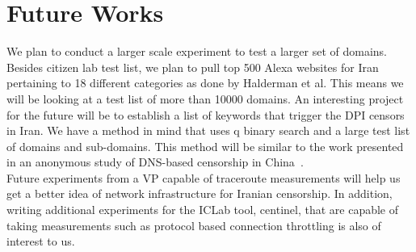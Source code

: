 \section{Future Works}\label{sec:futureworks}
We plan to conduct a larger scale experiment to test a larger set of domains. Besides citizen lab test list, we plan to pull top 500 Alexa websites for Iran pertaining to 18 different categories as done by Halderman et al. This means we will be looking at a test list of more than 10000 domains. An interesting project for the future will be to establish a list of keywords that trigger the DPI censors in Iran. We have a method in mind that uses q binary search and a large test list of domains and sub-domains. This method will be similar to the work presented in an anonymous study of DNS-based censorship in China~\cite{anon:dns_china}.\\ Future experiments from a VP capable of traceroute measurements will help us get a better idea of network infrastructure for Iranian censorship. In addition, writing additional experiments for the ICLab tool, centinel, that are capable of taking measurements such as protocol based connection throttling is also of interest to us. 
